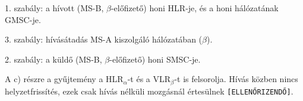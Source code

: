 1. szabály: a hívott (MS-B, $\beta$-előfizető) honi HLR-je, és a honi hálózatának GMSC-je.

\begin{center}\end{center}

3. szabály: hívásátadás MS-A kiszolgáló hálózatában ($\beta$).

\begin{center}\end{center}

2. szabály: a küldő (MS-B, $\beta$-előfizető) honi SMSC-je.

\begin{center}\end{center}
\begin{figyelem}[Javítás]
A c) részre a gyűjtemény a HLR$_\alpha$-t és a VLR$_\beta$-t is felsorolja. Hívás közben nincs helyzetfrissítés, ezek csak hívás nélküli mozgásnál értesülnek \texttt{[ELLENŐRIZENDŐ]}.
\end{figyelem}
\begin{eredmeny}

\begin{center}\end{center}
\end{eredmeny}


